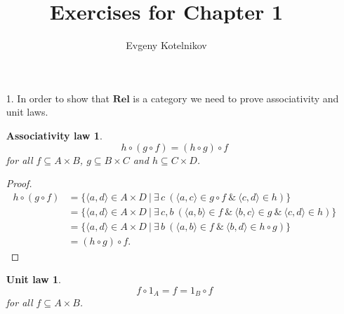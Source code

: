 \documentclass[12pt]{article}
\author{Evgeny Kotelnikov}
\title{Exercises for Chapter 1}
\date{}
\begin{document}
\maketitle

\begin{enumerate}

  \item[1.]
    In order to show that $\mathbf{Rel}$ is a category we need to prove associativity and unit laws.

    \newtheorem*{assoc}{Associativity law}
    \begin{assoc}
      $$h \circ (g \circ f) = (h \circ g) \circ f$$ for all $f \subseteq A \times B$, $g \subseteq B \times C$ and $h \subseteq C \times D$.
    \end{assoc}

    \begin{proof}
      \begin{equation*}
        \begin{array}{rl}
          h \circ (g \circ f) & = \{\langle a, d\rangle \in A \times D~|~\exists\, c~(\langle a, c \rangle \in g \circ f~\&~\langle c, d \rangle \in h) \} \\
                              & = \{\langle a, d\rangle \in A \times D~|~\exists\, c, b~(\langle a, b \rangle \in f~\&~\langle b, c \rangle \in g~\&~\langle c, d \rangle \in h) \} \\
                              & = \{\langle a, d\rangle \in A \times D~|~\exists\, b~(\langle a, b \rangle \in f~\&~\langle b, d \rangle \in h \circ g) \} \\
                              & = (h \circ g) \circ f.
        \end{array}
      \end{equation*}
    \end{proof}

    \newtheorem*{unit}{Unit law}
    \begin{unit}
      $$f \circ 1_A = f = 1_B \circ f$$ for all $f \subseteq A \times B$.
    \end{unit}


\end{enumerate}
\end{document}

